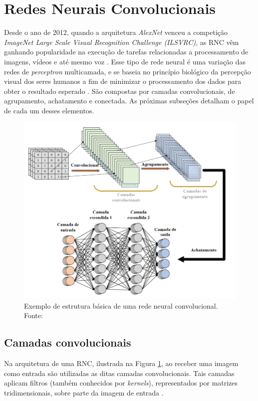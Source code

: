 \section{Redes Neurais Convolucionais}

Desde o ano de 2012, quando a arquitetura \textit{AlexNet} venceu a competição \textit{ImageNet Large Scale Visual Recognition Challenge (ILSVRC)}, as \acf{RNC} vêm ganhando popularidade na execução de tarefas relacionadas a processamento de imagens, vídeos e até mesmo voz \cite{vargas2016estudo}.
Esse tipo de rede neural é uma variação das redes de \textit{perceptron} multicamada, e se baseia no princípio biológico da percepção visual dos seres humanos a fim de minimizar o processamento dos dados para obter o resultado esperado \cite{mueller2019deep}. São compostas por camadas convolucionais, de agrupamento, achatamento e conectada. As próximas subseções detalham o papel de cada um desses elementos.

\begin{figure}[H]
  \centering
  \includegraphics[width=.8\linewidth]{figures/2_theoric_foundamentations/cnn.png}
  \caption[Estrutura básica de uma rede neural convolucional.]{Exemplo de estrutura básica de uma rede neural convolucional. Fonte: \cite{srinivasan2021durld}}
  \label{fig:cnn}
\end{figure}

\subsection{Camadas convolucionais}

Na arquitetura de uma \ac{RNC}, ilustrada na Figura \ref{fig:cnn}, ao receber uma imagem como entrada são utilizadas as ditas camadas convolucionais. Tais camadas aplicam filtros (também conhecidos por \textit{kernels}), representados por matrizes tridimensionais, sobre parte da imagem de entrada \cite{rawat2017deep}.

